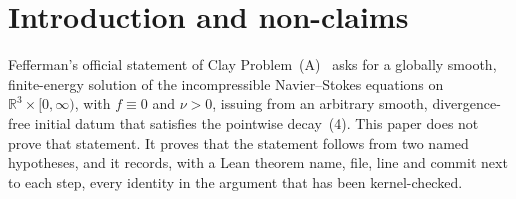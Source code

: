 \documentclass[11pt,a4paper]{article}
\theoremstyle{definition}
\theoremstyle{remark}
\newcommand{\R}{\mathbb{R}}
\begin{document}
\tableofcontents


\section{Introduction and non-claims}
\label{sec:intro}

Fefferman's official statement of Clay Problem~(A)~\cite{Fefferman} asks for a globally smooth, finite-energy solution of the incompressible Navier--Stokes equations on $\R^3\times[0,\infty)$, with $f\equiv 0$ and $\nu>0$, issuing from an arbitrary smooth, divergence-free initial datum that satisfies the pointwise decay~(4). This paper does not prove that statement. It proves that the statement follows from two named hypotheses, and it records, with a Lean theorem name, file, line and commit next to each step, every identity in the argument that has been kernel-checked.
\end{document}
